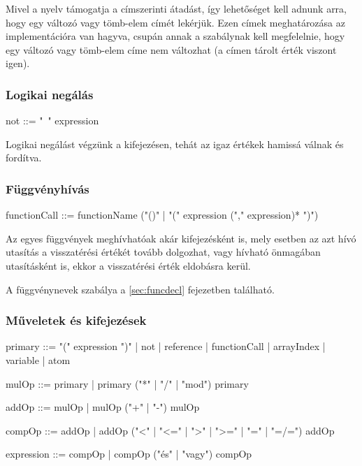 Mivel a nyelv támogatja a címszerinti átadást, így lehetőséget kell adnunk arra, hogy egy változó vagy tömb-elem címét lekérjük. Ezen címek meghatározása az implementációra van hagyva, csupán annak a szabálynak kell megfelelnie, hogy egy változó vagy tömb-elem címe nem változhat (a címen tárolt érték viszont igen).

\subsubsection{Logikai negálás}

\begin{ebnf}
not ::= "~" expression
\end{ebnf}

Logikai negálást végzünk a kifejezésen, tehát az igaz értékek hamissá válnak és fordítva.

\subsubsection{Függvényhívás}

\begin{ebnf}
functionCall ::= functionName ("()" | "(" expression ("," expression)* ")")
\end{ebnf}

Az egyes függvények meghívhatóak akár kifejezésként is, mely esetben az azt hívó utasítás a visszatérési értékét tovább dolgozhat, vagy hívható önmagában utasításként is, ekkor a visszatérési érték eldobásra kerül.

A függvénynevek szabálya a \ref{sec:funcdecl} fejezetben található.

\subsubsection{Műveletek és kifejezések}
\label{sec:expressions}

\begin{ebnf}
primary ::= "(" expression ")" 
    | not 
    | reference 
    | functionCall 
    | arrayIndex 
    | variable 
    | atom

mulOp ::= primary 
    | primary ("*" | "/" | "mod") primary

addOp ::= mulOp 
    | mulOp ("+" | "-") mulOp

compOp ::= addOp 
    | addOp ("<" | "<=" | ">" | ">=" | "=" | "=/=") addOp

expression ::= compOp 
    | compOp ("és" | "vagy") compOp
\end{ebnf}


